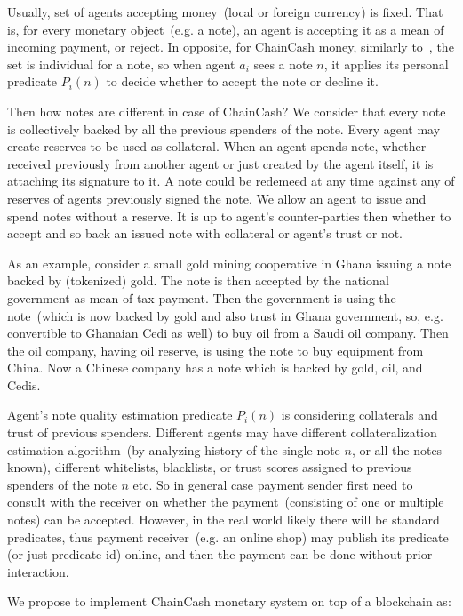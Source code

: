 \documentclass{article}   %
\newcommand{\cc}{ChainCash}
\begin{document}
Usually, set of agents accepting money~(local or foreign currency) is fixed. That is, for every monetary object~(e.g. a note), an agent is accepting it as a mean of incoming payment, or reject. In opposite, for \cc{} money, similarly to~\cite{saito2003peer}, the set is individual for a note, so when agent $a_i$ sees a note $n$, it applies its personal predicate $P_i(n)$ to decide whether to accept the note or decline it. 

Then how notes are different in case of \cc{}? We consider that every note is collectively backed by all the previous spenders of the note. Every agent may create reserves to be used as collateral. When an agent spends note, whether received previously from another agent or just created by the agent itself, it is attaching its signature to it. A note could be redemeed at any time against any of reserves of agents previously signed the note. We allow an agent to issue and spend notes without a reserve. It is up to agent's counter-parties then whether to accept and so back an issued note with collateral or agent's trust or not. 

As an example, consider a small gold mining cooperative in Ghana issuing a note backed by (tokenized) gold. The note is then accepted by the national government as mean of tax payment. Then the government is using the note~(which is now backed by gold and also trust in Ghana government, so, e.g. convertible to Ghanaian Cedi as well) to buy oil from a Saudi oil company. Then the oil company, having oil reserve, is using the note to buy equipment from China. Now a Chinese company has a note which is backed by gold, oil, and Cedis. 

Agent's note quality estimation predicate $P_i(n)$ is considering collaterals and trust of previous spenders. Different agents may have different 
collateralization estimation algorithm~(by analyzing history of the single note $n$, or all the notes known), different whitelists, blacklists, or trust scores assigned to previous spenders of the note $n$ etc. So in general case payment sender first need to consult with the receiver on whether the payment~(consisting of one or multiple notes) can be accepted. However, in the real world likely there will be standard predicates, thus payment receiver~(e.g. an online shop) may publish its predicate (or just predicate id) online, and then the payment can be done without prior interaction.

We propose to implement \cc{} monetary system on top of a blockchain as:
\end{document}
